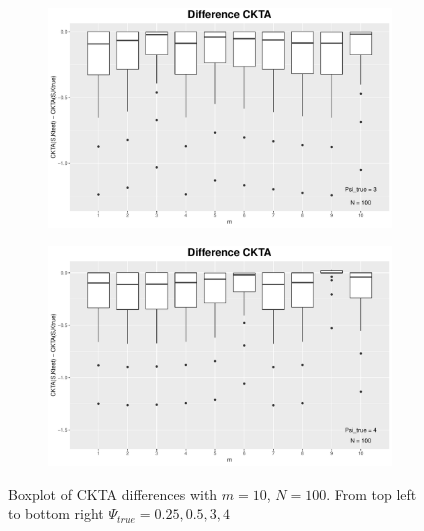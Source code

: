 \documentclass[11pt, a4paper]{article} %
\begin{document}
\begin{landscape}
\begin{figure}
\begin{subfigure}{\textwidth}
  \centering
  \includegraphics[width=.8\linewidth]{dif_ckta_psi_3.pdf}
  \label{fig:sfig1}
\end{subfigure}%
\begin{subfigure}{\textwidth}
  \centering
  \includegraphics[width=.8\linewidth]{dif_ckta_psi_4.pdf}
  \label{fig:sfig2}
\end{subfigure}%
\caption{Boxplot of CKTA differences with $m = 10$, $N = 100$. From top left to bottom right $\Psi_{true} = 0.25, 0.5, 3,4$}
\end{figure}
\end{landscape}

\restoregeometry
\end{document}
